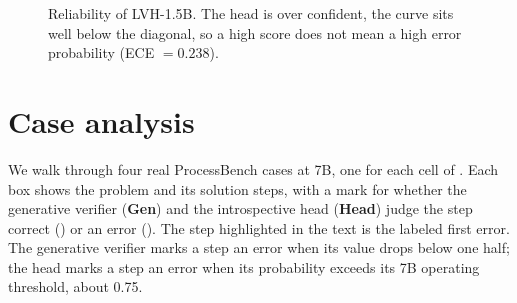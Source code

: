 \begin{figure}[h]
  \centering
  \caption{Reliability of LVH-1.5B. The head is over confident, the curve sits well below the diagonal, so a high score does not mean a high error probability (ECE $=0.238$).}
  \label{fig:calib}
\end{figure}

\section{Case analysis}
\label{app:cases}

We walk through four real ProcessBench cases at 7B, one for each cell of . Each box shows the problem and its solution steps, with a mark for whether the generative verifier (\textbf{Gen}) and the introspective head (\textbf{Head}) judge the step correct (\vgood) or an error (\vbad). The step highlighted in the text is the labeled first error. The generative verifier marks a step an error when its value drops below one half; the head marks a step an error when its probability exceeds its 7B operating threshold, about 0.75.


